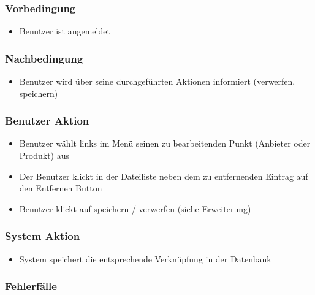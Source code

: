 \documentclass[a4paper,12pt]{article}
\begin{document}
\subsubsection{Vorbedingung}\label{vorbedingung-7}

\begin{itemize}

\item
  Benutzer ist angemeldet
\end{itemize}

\subsubsection{Nachbedingung}\label{nachbedingung-7}

\begin{itemize}

\item
  Benutzer wird über seine durchgeführten Aktionen informiert
  (verwerfen, speichern)
\end{itemize}

\subsubsection{Benutzer Aktion}\label{benutzer-aktion-7}

\begin{itemize}

\item
  Benutzer wählt links im Menü seinen zu bearbeitenden Punkt (Anbieter
  oder Produkt) aus
\item
  Der Benutzer klickt in der Dateiliste neben dem zu entfernenden
  Eintrag auf den Entfernen Button
\item
  Benutzer klickt auf speichern / verwerfen (siehe Erweiterung)
\end{itemize}

\subsubsection{System Aktion}\label{system-aktion-7}

\begin{itemize}

\item
  System speichert die entsprechende Verknüpfung in der Datenbank
\end{itemize}

\subsubsection{Fehlerfälle}\label{fehlerfalle-7}
\end{document}
